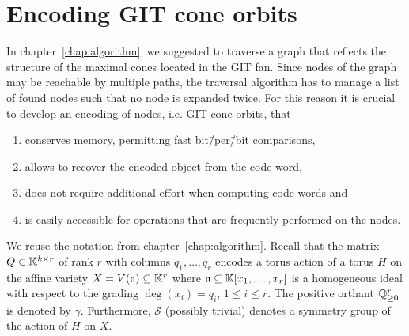 \section{Encoding GIT cone orbits}
\label{sec:git_cone_management}
In chapter~\ref{chap:algorithm}, we suggested to traverse a graph that reflects the structure of the maximal cones located in the GIT fan. Since nodes of the graph may be reachable by multiple paths, the traversal algorithm has to manage a list of found nodes such that no node is expanded twice. For this reason it is crucial to develop an encoding of nodes, i.e. GIT cone orbits, that 
\begin{enumerate}[label={\upshape(\roman*)}]
	\item conserves memory, permitting fast bit\=/per\=/bit comparisons,
		\label{enum_item:git_cone_orbit_property_memory}
	\item allows to recover the encoded object from the code word,
		\label{enum_item:git_cone_orbit_property_invertible}
	\item does not require additional effort when computing code words and
		 \label{enum_item:git_cone_orbit_property_computation_effort}
	\item is easily accessible for operations that are frequently performed on the nodes.
		\label{enum_item:git_cone_orbit_property_operations}
\end{enumerate}

We reuse the notation from chapter~\ref{chap:algorithm}. Recall that the matrix $Q\in\mathbb{K}^{k\times r}$ of rank $r$ with columns $q_1,\dots,q_r$ encodes a torus action of a torus $H$ on the affine variety $X = V(\mathfrak{a})\subseteq \mathbb{K}^r$ where $\mathfrak{a}\subseteq \mathbb{K}[x_1,\dots,x_r]$ is a homogeneous ideal with respect to the grading $\deg(x_i) = q_i$, $1\leq i\leq r$. The positive orthant $\mathbb{Q}_{\geq 0}^r$ is denoted by $\gamma$. Furthermore, $\mathcal{S}$ (possibly trivial) denotes a symmetry group of the action of $H$ on $X$.

